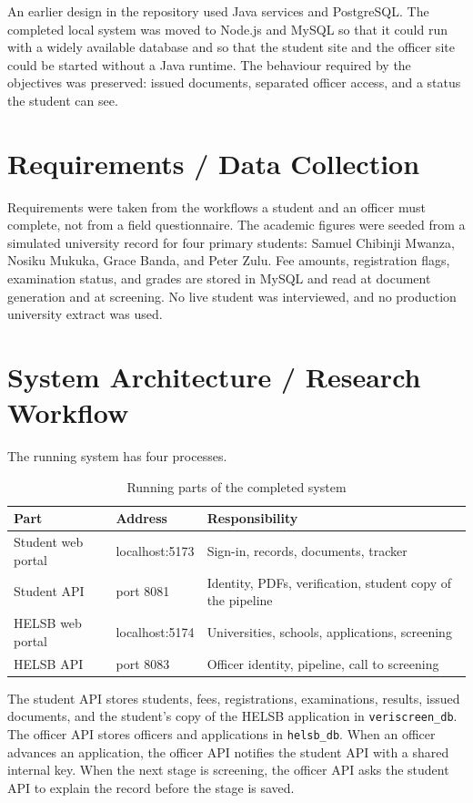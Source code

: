 \documentclass[12pt,a4paper]{report}
\begin{document}
An earlier design in the repository used Java services and PostgreSQL. The completed local system was moved to Node.js and MySQL so that it could run with a widely available database and so that the student site and the officer site could be started without a Java runtime. The behaviour required by the objectives was preserved: issued documents, separated officer access, and a status the student can see.

\section{Requirements / Data Collection}
Requirements were taken from the workflows a student and an officer must complete, not from a field questionnaire. The academic figures were seeded from a simulated university record for four primary students: Samuel Chibinji Mwanza, Nosiku Mukuka, Grace Banda, and Peter Zulu. Fee amounts, registration flags, examination status, and grades are stored in MySQL and read at document generation and at screening. No live student was interviewed, and no production university extract was used.

\section{System Architecture / Research Workflow}
The running system has four processes.

\begin{table}[H]
\centering
\caption{Running parts of the completed system}
\label{tab:processes}
\begin{tabular}{p{}p{}p{}}
\toprule
Part & Address & Responsibility\\
\midrule
Student web portal & localhost:5173 & Sign-in, records, documents, tracker\\
Student API & port 8081 & Identity, PDFs, verification, student copy of the pipeline\\
HELSB web portal & localhost:5174 & Universities, schools, applications, screening\\
HELSB API & port 8083 & Officer identity, pipeline, call to screening\\
\bottomrule
\end{tabular}
\end{table}

The student API stores students, fees, registrations, examinations, results, issued documents, and the student's copy of the HELSB application in \texttt{veriscreen\_db}. The officer API stores officers and applications in \texttt{helsb\_db}. When an officer advances an application, the officer API notifies the student API with a shared internal key. When the next stage is screening, the officer API asks the student API to explain the record before the stage is saved.
\end{document}
